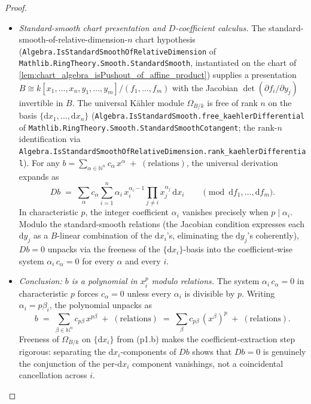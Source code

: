 \begin{proof}
\begin{itemize}
    \item[(p1.b)] \emph{Standard-smooth chart presentation and \(D\)-coefficient calculus.} The standard-smooth-of-relative-dimension-\(n\) chart hypothesis (\texttt{Algebra.IsStandardSmoothOfRelativeDimension} of \texttt{Mathlib.RingTheory.Smooth.StandardSmooth}, instantiated on the chart of \cref{lem:chart_algebra_isPushout_of_affine_product}) supplies a presentation \(B \cong k[x_1, \ldots, x_n, y_1, \ldots, y_m] / (f_1, \ldots, f_m)\) with the Jacobian \(\det(\partial f_i / \partial y_j)\) invertible in \(B\). The universal K\"ahler module \(\Omega_{B/k}\) is free of rank \(n\) on the basis \(\{\mathrm dx_1, \ldots, \mathrm dx_n\}\) (\texttt{Algebra.IsStandardSmooth.free\_kaehlerDifferential} of \texttt{Mathlib.RingTheory.Smooth.StandardSmoothCotangent}; the rank-\(n\) identification via \texttt{Algebra.IsStandardSmoothOfRelativeDimension.rank\_kaehlerDifferential}). For any \(b = \sum_{\alpha \in \mathbb N^n} c_\alpha\, x^\alpha\;+\;(\text{relations})\), the universal derivation expands as
    \[
      D b \;=\; \sum_{\alpha} c_\alpha\!\!\sum_{i=1}^{n} \alpha_i\, x_i^{\alpha_i - 1}\!\!\prod_{j \neq i} x_j^{\alpha_j}\, \mathrm dx_i \qquad \pmod{\mathrm df_1, \ldots, \mathrm df_m}.
    \]
    In characteristic \(p\), the integer coefficient \(\alpha_i\) vanishes precisely when \(p \mid \alpha_i\). Modulo the standard-smooth relations (the Jacobian condition expresses each \(\mathrm dy_j\) as a \(B\)-linear combination of the \(\mathrm dx_i\)'s, eliminating the \(\mathrm dy_j\)'s coherently), \(D b = 0\) unpacks via the freeness of the \(\{\mathrm dx_i\}\)-basis into the coefficient-wise system \(\alpha_i\, c_\alpha = 0\) for every \(\alpha\) and every \(i\).
    \item[(p1.c)] \emph{Conclusion: \(b\) is a polynomial in \(x_i^p\) modulo relations.} The system \(\alpha_i\, c_\alpha = 0\) in characteristic \(p\) forces \(c_\alpha = 0\) unless every \(\alpha_i\) is divisible by \(p\). Writing \(\alpha_i = p \beta_i\), the polynomial unpacks as
    \[
      b \;=\; \sum_{\beta \in \mathbb N^n} c_{p \beta}\, x^{p \beta} \;+\; (\text{relations}) \;=\; \sum_{\beta} c_{p \beta}\,(x^{\beta})^{p} \;+\; (\text{relations}).
    \]
    Freeness of \(\Omega_{B/k}\) on \(\{\mathrm dx_i\}\) from (p1.b) makes the coefficient-extraction step rigorous: separating the \(\mathrm dx_i\)-components of \(D b\) shows that \(D b = 0\) is genuinely the conjunction of the per-\(\mathrm dx_i\) component vanishings, not a coincidental cancellation across \(i\).

\end{itemize}
\end{proof}

